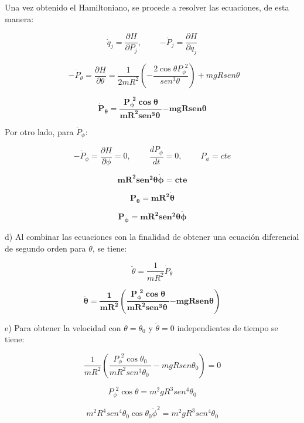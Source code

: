 \documentclass[]{article}
\begin{document}
Una vez obtenido el Hamiltoniano, se procede a resolver las ecuaciones,
de esta manera:

\[{\dot{q}}_{j} = \frac{\partial H}{\partial P_{j}},\ \ \ \ \ \ \ \ \ \ {- \dot{P}}_{j} = \frac{\partial H}{\partial q_{j}}\]

\[\ \ {- \dot{P}}_{\theta} = \frac{\partial H}{\partial\theta} = \frac{1}{2mR^{2}}\left( - \frac{2{\cos\theta P}_{\phi}^{\ \ 2}}{{sen}^{3}\theta\ } \right) + mgR{sen}\theta\]

\[{\dot{\mathbf{P}}}_{\mathbf{\theta}}\mathbf{=}\frac{\mathbf{P}_{\mathbf{\phi}}^{\mathbf{\ \ 2}}\mathbf{\cos}\mathbf{\theta}}{\mathbf{m}\mathbf{R}^{\mathbf{2}}\mathbf{sen}^{\mathbf{3}}\mathbf{\theta}\mathbf{\ }}\mathbf{- mgR}\mathbf{sen}\mathbf{\theta}\]

Por otro lado, para \({\dot{P}}_{\phi}:\)

\[- {\dot{P}}_{\phi} = \frac{\partial H}{\partial\phi} = 0,\ \ \ \ \ \ \ \ \ \ \frac{dP_{\phi}}{dt} = 0,\ \ \ \ \ \ \ \ \ \ P_{\phi} = cte\]

\[\mathbf{m}\mathbf{R}^{\mathbf{2}}\mathbf{sen}^{\mathbf{2}}\mathbf{\theta}\dot{\mathbf{\phi}}\mathbf{= cte}\]

\[\mathbf{P}_{\mathbf{\theta}}\mathbf{= m}\mathbf{R}^{\mathbf{2}}\dot{\mathbf{\theta}}\]

\[\mathbf{P}_{\mathbf{\phi}}\mathbf{= m}\mathbf{R}^{\mathbf{2}}\mathbf{sen}^{\mathbf{2}}\mathbf{\theta}\dot{\mathbf{\phi}}\]

d) Al combinar las ecuaciones con la finalidad de obtener una ecuación
diferencial de segundo orden para \(\theta\), se tiene:

\[\ddot{\theta} = \frac{1}{mR^{2}}{\dot{P}}_{\theta}\]

\[\ddot{\mathbf{\theta}}\mathbf{=}\frac{\mathbf{1}}{\mathbf{m}\mathbf{R}^{\mathbf{2}}}\left( \frac{\mathbf{P}_{\mathbf{\phi}}^{\mathbf{\ \ 2}}\mathbf{\cos}\mathbf{\theta}}{\mathbf{m}\mathbf{R}^{\mathbf{2}}\mathbf{sen}^{\mathbf{3}}\mathbf{\theta}\mathbf{\ }}\mathbf{- mgR}\mathbf{sen}\mathbf{\theta} \right)\]

e) Para obtener la velocidad con \(\theta = \theta_{0}\) y
\(\dot{\theta} = 0\) independientes de tiempo se tiene:

\[\frac{1}{mR^{2}}\left( \frac{P_{\phi}^{\ \ 2}\cos\theta_{0}}{mR^{2}{sen}^{3}\theta_{0}\ } - mgR{sen}\theta_{0} \right) = 0\]

\[P_{\phi}^{\ \ 2}\cos\theta = m^{2}gR^{3}{sen}^{4}\theta_{0}\]

\[m^{2}R^{4}{sen}^{4}\theta_{0}\cos\theta_{0}{\dot{\phi}}^{2} = m^{2}gR^{3}{sen}^{4}\theta_{0}\]
\end{document}
